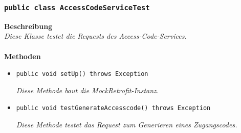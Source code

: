 \documentclass[a4paper]{scrreprt}
\begin{document}
	\subsubsection{\texttt{public class AccessCodeServiceTest}}
	\textbf{Beschreibung}\\
	\textit{Diese Klasse testet die Requests des Access-Code-Services.}\\
	\\	
	\textbf{Methoden}
	\begin{itemize}

		\item\texttt{{public void setUp() throws Exception}}
		
		\textit{Diese Methode baut die MockRetrofit-Instanz.}
		
		\item\texttt{{public void testGenerateAccesscode() throws Exception}}
		
		\textit{Diese Methode testet das Request zum Generieren eines Zugangscodes.}
		
		
	\end{itemize}
\end{document}
